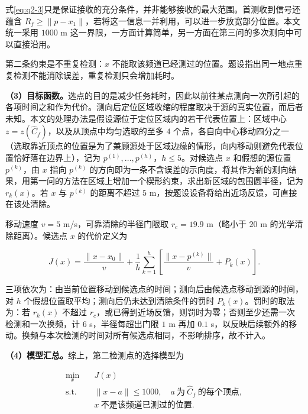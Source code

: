 式\eqref{eq:q2-3}只是保证接收的充分条件，并非能够接收的最大范围。首测收到信号还蕴含 $R_f\ge\|p-x_1\|$，若将这一信息一并利用，可以进一步放宽部分位置。本文统一采用 $1000$ m 这一界限，一方面计算简单，另一方面在第三问的多次测向中可以直接沿用。

第二条约束是不重复检测：$x$ 不能取该频道已经测过的位置。题设指出同一地点重复检测不能消除误差，重复检测只会增加耗时。

\textbf{（3）目标函数。}选点的目的是减少任务耗时，因此以前往某点测向一次所引起的各项时间之和作为代价。测向后定位区域收缩的程度取决于源的真实位置，而后者未知。本文的处理办法是假设源位于定位区域内的若干代表位置上：区域中心 $z=z(\widehat C_f)$，以及从顶点中均匀选取的至多 $4$ 个点，各自向中心移动四分之一（选取靠近顶点的位置是为了兼顾源处于区域边缘的情形，向内移动则避免代表位置恰好落在边界上），记为 $p^{(1)},\dots,p^{(h)}$，$h\le5$。对候选点 $x$ 和假想的源位置 $p^{(k)}$，由 $x$ 指向 $p^{(k)}$ 的方向即为一条不含误差的示向度，将其作为新的测向结果，用第一问的方法在区域上增加一个楔形约束，求出新区域的包围圆半径，记为 $r_k(x)$。若 $x$ 与 $p^{(k)}$ 的距离不超过 $5$ m，按题设设备将给出近场反馈，可直接在该处清除。

移动速度 $v=5$ m/s，可靠清除的半径门限取 $r_c=19.9$ m（略小于 $20$ m 的光学清除距离）。候选点 $x$ 的代价定义为

\begin{equation}\label{eq:q2-5}
J(x)=\frac{\|x-x_0\|}{v}
+\frac1h\sum_{k=1}^{h}\left[\frac{\|x-p^{(k)}\|}{v}+P_k(x)\right].
\end{equation}

三项依次为：由当前位置移动到候选点的时间；测向后由候选点移动到源的时间，对 $h$ 个假想位置取平均；测向后仍未达到清除条件的罚时 $P_k(x)$。罚时的取法为：若 $r_k(x)$ 不超过 $r_c$，或已得到近场反馈，则罚时为零；否则至少还需一次检测和一次换频，计 $6$ s，半径每超出门限 $1$ m 再加 $0.1$ s，以反映后续额外的移动。换频与本次检测的时间对所有候选点相同，不影响排序，故不计入。

\textbf{（4）模型汇总。}综上，第二检测点的选择模型为

\begin{equation}\label{eq:q2-6}
\begin{aligned}
\min_{x}\quad & J(x)\\
\text{s.t.}\quad & \|x-a\|\le1000,\quad a\ \text{为}\ \widehat C_f\ \text{的每个顶点},\\
& x\ \text{不是该频道已测过的位置}.
\end{aligned}
\end{equation}

